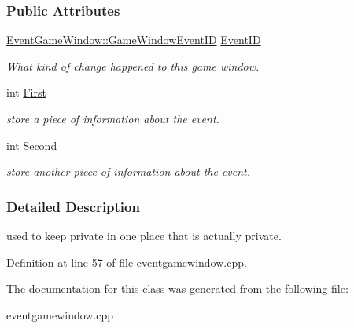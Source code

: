 \subsubsection*{Public Attributes}
\begin{DoxyCompactItemize}
\item 
\hypertarget{classphys_1_1EventGameWindowData_aee5633e59e1f147d001d04e98a4f53a0}{
\hyperlink{classphys_1_1EventGameWindow_a45225255070513d3cff88cdfea25cc09}{EventGameWindow::GameWindowEventID} \hyperlink{classphys_1_1EventGameWindowData_aee5633e59e1f147d001d04e98a4f53a0}{EventID}}
\label{classphys_1_1EventGameWindowData_aee5633e59e1f147d001d04e98a4f53a0}

\begin{DoxyCompactList}\small\item\em What kind of change happened to this game window. \item\end{DoxyCompactList}\item 
\hypertarget{classphys_1_1EventGameWindowData_ac21fb863e39f60821ea8017025884078}{
int \hyperlink{classphys_1_1EventGameWindowData_ac21fb863e39f60821ea8017025884078}{First}}
\label{classphys_1_1EventGameWindowData_ac21fb863e39f60821ea8017025884078}

\begin{DoxyCompactList}\small\item\em store a piece of information about the event. \item\end{DoxyCompactList}\item 
\hypertarget{classphys_1_1EventGameWindowData_ae4d7e70e2539f90dc18272bc092b711e}{
int \hyperlink{classphys_1_1EventGameWindowData_ae4d7e70e2539f90dc18272bc092b711e}{Second}}
\label{classphys_1_1EventGameWindowData_ae4d7e70e2539f90dc18272bc092b711e}

\begin{DoxyCompactList}\small\item\em store another piece of information about the event. \item\end{DoxyCompactList}\end{DoxyCompactItemize}


\subsubsection{Detailed Description}
used to keep private in one place that is actually private. 

Definition at line 57 of file eventgamewindow.cpp.



The documentation for this class was generated from the following file:\begin{DoxyCompactItemize}
\item 
eventgamewindow.cpp\end{DoxyCompactItemize}
